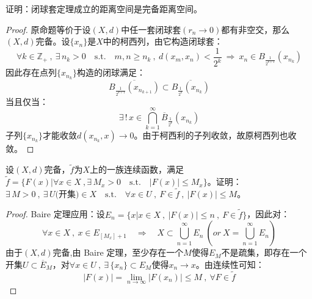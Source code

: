 \begin{example}
\quad 证明：闭球套定理成立的距离空间是完备距离空间。
\end{example}
\begin{proof}
原命题等价于设$(X,d)$中任一套闭球套$(r_n \to 0)$都有非空交，那么$(X,d)$完备。设$\{x_n\}$是$X$中的柯西列，由它构造闭球套：
\[\forall k \in \mathbb{Z}_+ \ , \ \exists \, n_k>0 \quad \text{s.t.} \quad m,n \geq n_k \ , \ d(x_m,x_n)<\frac{1}{2^k} \ \Rightarrow \ x_n \in B_{\frac{1}{2^{k+1}}}(x_{n_k})\]
因此存在点列$\{x_{n_k}\}$构造的闭球满足：
\[\overline{B_{\frac{1}{2^{k+1}}}(x_{n_{k+1}})} \subset \overline{B_{\frac{1}{2^k}}(x_{n_k})}\]
当且仅当：
\[\exists \,! \, x \in \bigcap_{k=1}^{\infty}\overline{B}_{\frac{1}{2^k}}(x_{n_k})\]
子列$\{x_{n_k}\}$才能收敛$d(x_{n_k},x) \to 0$。由于柯西利的子列收敛，故原柯西列也收敛。
\end{proof}

\begin{example}
\quad 设$(X,d)$完备，$\tilde{f}$为$X$上的一族连续函数，满足$\tilde{f}=\{F(x)|\forall x \in X \ , \exists \, M_x>0 \quad \text{s.t.} \quad |F(x)| \leq M_x\}$。证明：$\exists \, M>0 \ , \ \exists \, U\text{(开集)} \in X \quad \text{s.t.} \quad \forall x \in U \ , \ F \in \tilde{f} \ , \ |F(x)| \leq M$。
\end{example}
\begin{proof}
Baire 定理应用：设$E_n=\{x|x \in X \ , \ |F(x)| \leq n \ , \ F \in \tilde{f}\}$，因此对：
\[\forall x \in X \ , \ x \in E_{[M_x]+1} \quad \Rightarrow \quad X \subset \bigcup_{n=1}^{\infty}E_n \ \left(or \ X=\bigcup_{n=1}^{\infty}E_n \right)\]
由于$(X,d)$完备,由 Baire 定理，至少存在一个$M$使得$E_M$不是疏集，即存在一个开集$U \subset \overline{E}_M$，对$\forall x \in U \ , \ \exists \, \{x_n\} \subset E_M$使得$x_n \to x$。由连续性可知：
\[|F(x)|=\lim_{n \to \infty}|F(x_n)| \leq M \ , \ \forall F \in \tilde{f}\]
\end{proof}

